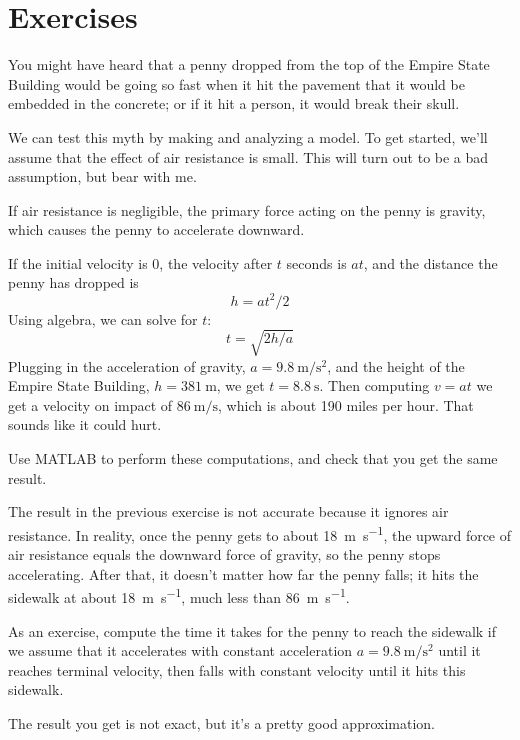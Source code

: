 \section{Exercises}

\begin{ex}
\label{penny}
You might have heard that a penny dropped from the top of the Empire State Building would be going so fast when it hit the pavement that it would be embedded in the concrete; or if it hit a person, it would break their skull.


We can test this myth by making and analyzing a model.  To get started, we'll assume that the effect of air resistance is small.  This will turn out to be a bad assumption, but bear with me.

If air resistance is negligible, the primary force acting on the penny is gravity, which causes the penny to accelerate downward.


If the initial velocity is 0, the velocity after $t$ seconds is $a t$, and the distance the penny has dropped is
%
\[ h = a t^2 / 2 \]
%
Using algebra, we can solve for $t$:
%
\[ t = \sqrt{ 2 h / a} \]
%
Plugging in the acceleration of gravity, 
$a = \SI{9.8}{\meter\per\second\squared}$, and the height of the Empire State Building, 
$h = \SI{381}{\meter}$, we get 
$t = \SI{8.8}{\second}$.  
Then computing $v = a t$ we get a velocity on impact of $\SI{86}{\meter\per\second}$, which is about 190 miles per hour.  That sounds like it could hurt.

Use MATLAB to perform these computations, and check that you get the same result.
\end{ex}

\begin{ex}
The result in the previous exercise is not accurate because it ignores air resistance.  In reality, once the penny gets to about \SI{18}{\meter\per\second}, the upward force of air resistance equals the downward force of gravity, so the penny stops accelerating.  After that, it doesn't matter how far the penny falls; it hits the sidewalk at about \SI{18}{\meter\per\second}, much less than \SI{86}{\meter\per\second}.

As an exercise, compute the time it takes for the penny to reach the sidewalk if we assume that it accelerates with constant acceleration
$a = \SI{9.8}{\meter\per\second\squared}$ until it reaches terminal velocity, then falls with constant velocity until it hits this sidewalk.

The result you get is not exact, but it's a pretty good approximation.

\end{ex}

